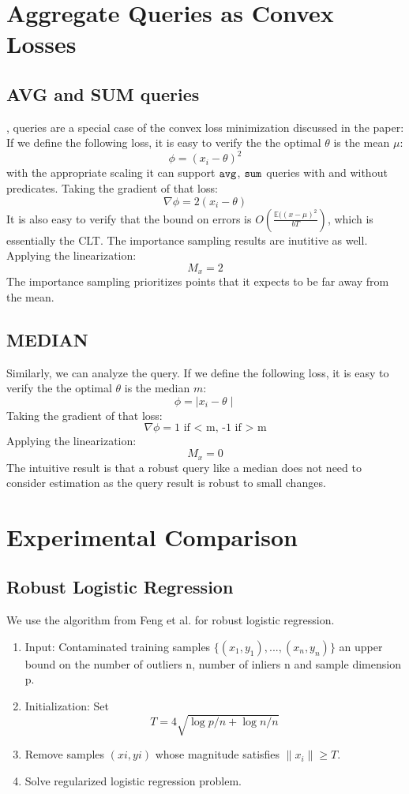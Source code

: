 \section{Aggregate Queries as Convex Losses}
\subsection{AVG and SUM queries}
\avgfunc, \sumfunc queries are a special case of the convex loss minimization discussed in the paper:
If we define the following loss, it is easy to verify the the optimal $\theta$ is the mean $\mu$:
\[
\phi = (x_{i} - \theta)^2
\]
with the appropriate scaling it can support $\texttt{avg} $, $\texttt{sum} $ queries with and without predicates.
Taking the gradient of that loss:
\[
\nabla\phi = 2(x_{i} - \theta)
\]
It is also easy to verify that the bound on errors is $O(\frac{\mathbb{E}((x-\mu)^2}{bT})$, which is essentially the CLT.
The importance sampling results are inutitive as well.
Applying the linearization:
\[
M_x = 2
\]
The importance sampling prioritizes points that it expects to be far away from the mean.

\subsection{MEDIAN}
Similarly, we can analyze the \medfunc query.
If we define the following loss, it is easy to verify the the optimal $\theta$ is the median $m$:
\[
\phi = \mid x_{i} - \theta\mid
\]
Taking the gradient of that loss:
\[
\nabla\phi = \text{1 if < m, -1 if > m}
\]
Applying the linearization:
\[
M_x = 0
\]
The intuitive result is that a robust query like a median does not need to consider estimation as the query result is robust to small changes.

\section{Experimental Comparison}
\subsection{Robust Logistic Regression}\label{rlogit}
We use the algorithm from Feng et al. for robust logistic regression.
\begin{enumerate}
\item Input: Contaminated training samples $\{(x_1, y_1), . . . ,(x_{n}
, y_{n})\}$ an upper bound on the number of outliers n, number of inliers n and sample dimension p.
\item Initialization: Set \[T = 4\sqrt{\log p/n + \log n/n}\]
\item Remove samples $(xi
, yi)$ whose magnitude satisfies $\|x_i\| \ge T$.
\item Solve regularized logistic regression problem.
\end{enumerate}

